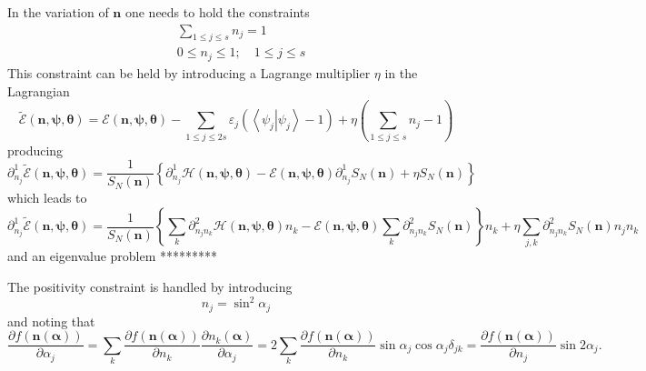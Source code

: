 \documentclass[aps,preprint]{revtex4}%
\begin{document}
In the variation of $\mathbf{n}$ one needs to hold the constraints
\begin{align}
&  \sum_{1\leq j\leq s}n_{j}=1\label{numeq}\\
&  0\leq n_{j}\leq1;\quad1\leq j\leq s \label{numpos}%
\end{align}
This constraint can be held by introducing a Lagrange multiplier $\eta$ in the
Lagrangian
\begin{equation}
\mathcal{\tilde{E}}\left(  \mathbf{n},\mathbf{\psi},\mathbf{\theta}\right)
=\mathcal{E}\left(  \mathbf{n},\mathbf{\psi},\mathbf{\theta}\right)
-\sum_{1\leq j\leq2s}\varepsilon_{j}\left(  \left\langle \left.  \psi
_{j}\right\vert \psi_{j}\right\rangle -1\right)  +\eta\left(  \sum_{1\leq
j\leq s}n_{j}-1\right)
\end{equation}
producing
\begin{equation}
\partial_{n_{j}}^{1}\mathcal{\tilde{E}}\left(  \mathbf{n},\mathbf{\psi
},\mathbf{\theta}\right)  =\frac{1}{S_{N}\left(  \mathbf{n}\right)  }\left\{
\partial_{n_{j}}^{1}\mathcal{H}\left(  \mathbf{n},\mathbf{\psi},\mathbf{\theta
}\right)  -\mathcal{E}\left(  \mathbf{n},\mathbf{\psi},\mathbf{\theta}\right)
\partial_{n_{j}}^{1}S_{N}\left(  \mathbf{n}\right)  +\eta S_{N}\left(
\mathbf{n}\right)  \right\}
\end{equation}
which leads to
\begin{equation}
\partial_{n_{j}}^{1}\mathcal{\tilde{E}}\left(  \mathbf{n},\mathbf{\psi
},\mathbf{\theta}\right)  =\frac{1}{S_{N}\left(  \mathbf{n}\right)  }\left\{
{\textstyle\sum\limits_{k}}
\partial_{n_{j}n_{k}}^{2}\mathcal{H}\left(  \mathbf{n},\mathbf{\psi
},\mathbf{\theta}\right)  n_{k}-\mathcal{E}\left(  \mathbf{n},\mathbf{\psi
},\mathbf{\theta}\right)
{\textstyle\sum\limits_{k}}
\partial_{n_{j}n_{k}}^{2}S_{N}\left(  \mathbf{n}\right)  \right\}  n_{k}+\eta%
{\textstyle\sum\limits_{j,k}}
\partial_{n_{j}n_{k}}^{2}S_{N}\left(  \mathbf{n}\right)  n_{j}n_{k}%
\end{equation}
and an eigenvalue problem *********

The positivity constraint is handled by introducing
\begin{equation}
n_{j}=\sin^{2}\alpha_{j}%
\end{equation}
and noting that
\begin{equation}
\frac{\partial f\left(  \mathbf{n}\left(  \mathbf{\alpha}\right)  \right)
}{\partial\alpha_{j}}=\sum\limits_{k}\frac{\partial f\left(  \mathbf{n}\left(
\mathbf{\alpha}\right)  \right)  }{\partial n_{k}}\frac{\partial n_{k}\left(
\mathbf{\alpha}\right)  }{\partial\alpha_{j}}=2\sum\limits_{k}\frac{\partial
f\left(  \mathbf{n}\left(  \mathbf{\alpha}\right)  \right)  }{\partial n_{k}%
}\sin\alpha_{j}\cos\alpha_{j}\delta_{jk}=\frac{\partial f\left(
\mathbf{n}\left(  \mathbf{\alpha}\right)  \right)  }{\partial n_{j}}%
\sin2\alpha_{j}.
\end{equation}
\end{document}
